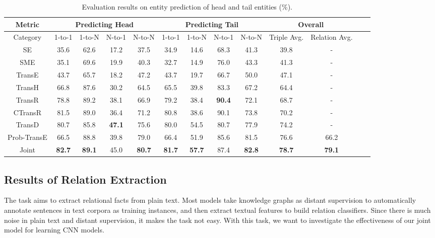 \documentclass[11pt,a4paper]{article}
\begin{document}
\begin{table}[htb]
\centering
\small
\begin{tabular}{|c|cccc|cccc|c|c|c|c|}
\hline
Metric            & \multicolumn{4}{c|}{Predicting Head} & \multicolumn{4}{c|}{Predicting Tail} & \multicolumn{2}{c|}{Overall} \\ \hline
      Category            & 1-to-1     & 1-to-N    & N-to-1    & N-to-N    & 1-to-1     & 1-to-N    & N-to-1    & N-to-N  & Triple Avg. & Relation Avg. \\ \hline

SE &35.6 &62.6 &17.2 &37.5 &34.9 &14.6 &68.3 &41.3 &39.8 & - \\ 
SME &35.1 &69.6 &19.9 &40.3 &32.7 &14.9 &76.0 &43.3 &41.3 & - \\ 
TransE            & 43.7       & 65.7      & 18.2      & 47.2      & 43.7       & 19.7      & 66.7      & 50.0    & 47.1 & - \\ 
TransH     & 66.8       & 87.6      & 30.2      & 64.5      & 65.5       & 39.8      & 83.3      & 67.2    & 64.4 & - \\ 
TransR     & 78.8       & 89.2      & 38.1      & 66.9      & 79.2       & 38.4      &\textbf{90.4}      & 72.1    & 68.7 & - \\ 
CTransR     & 81.5      & 89.0      & 36.4      & 71.2      & 80.8       & 38.6      &90.1      & 73.8    & 70.2 & - \\ 

TransD  &80.7  &85.8  &\textbf{47.1} &75.6  &80.0 &54.5 &80.7 &77.9  &74.2 &- \\ \hline


Prob-TransE      & 66.5       & 88.8      & 39.8      & 79.0      & 66.4       & 51.9      & 85.6      & 81.5    & 76.6 & 66.2 \\ 
Joint             & \textbf{82.7}& \textbf{89.1} &45.0 & \textbf{80.7}& \textbf{81.7}& \textbf{57.7}& 87.4&\textbf{82.8} & \textbf{78.7} & \textbf{79.1} \\ \hline
\end{tabular}
\caption{Evaluation results on entity prediction of head and tail entities (\%).}
\label{t:entity}
\end{table}


\subsection{Results of Relation Extraction}

The task aims to extract relational facts from plain text. Most models \cite{mintz2009distant,riedel2010modeling,hoffmann2011knowledge,surdeanu2012multi,zeng2014relation,zeng2015distant,lin2016neural} take knowledge graphs as distant supervision to automatically annotate sentences in text corpora as training instances, and then extract textual features to build relation classifiers. Since there is much noise in plain text and distant supervision, it makes the task not easy. With this task, we want to investigate the effectiveness of our joint model for learning CNN models.
\end{document}

